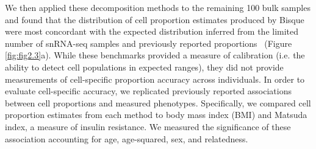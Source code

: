 We then applied these decomposition methods to the remaining 100 bulk samples and found that the distribution of cell proportion estimates produced by Bisque were most concordant with the expected distribution inferred from the limited number of snRNA-seq samples and previously reported proportions~\cite{Rosen2014-ae,Glastonbury_undated-kk} (Figure \ref{fig:fig2.3}a). While these benchmarks provided a measure of calibration (i.e. the ability to detect cell populations in expected ranges), they did not provide measurements of cell-specific proportion accuracy across individuals. In order to evaluate cell-specific accuracy, we replicated previously reported associations between cell proportions and measured phenotypes. Specifically, we compared cell proportion estimates from each method to body mass index (BMI) and Matsuda index, a measure of insulin resistance. We measured the significance of these association accounting for age, age-squared, sex, and relatedness.

